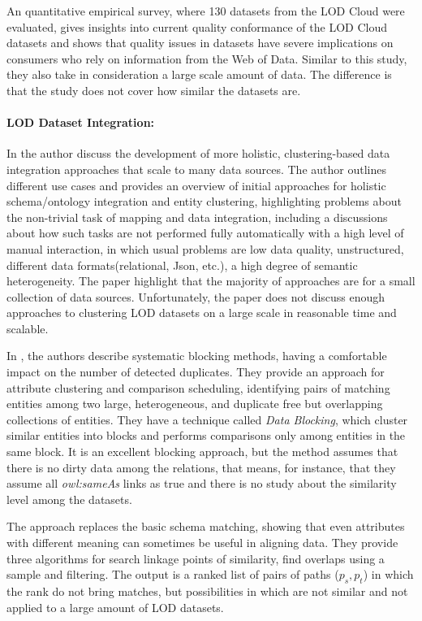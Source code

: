 \documentclass[sw]{iosart2x}
\begin{document}
An quantitative empirical survey, where 130 datasets from the LOD Cloud were evaluated, gives insights into current quality conformance of the LOD Cloud datasets\cite{debattista2018evaluating} and shows that quality issues in datasets have severe implications on consumers who rely on information from the Web
of Data.
Similar to this study, they also take in consideration a large scale amount of data.
The difference is that the study does not cover how similar the datasets are.

\paragraph*{\textbf{LOD Dataset Integration:}}
In \cite{rahm2016case} the author discuss the development of more holistic, clustering-based data integration approaches that scale to many data sources.
The author outlines different use cases and provides an overview of initial approaches for holistic schema/ontology integration and entity clustering, highlighting problems about the non-trivial task of mapping and data integration, including a discussions about how such tasks are not performed fully automatically with a high level of manual interaction, in which usual problems are low data quality, unstructured, different data formats(relational, Json, etc.), a high degree of semantic heterogeneity.
The paper highlight that the majority of approaches are for a small collection of data sources.
Unfortunately, the paper does not discuss enough approaches to clustering LOD datasets on a large scale in reasonable time and scalable.

In \cite{papadakis2012blocking}, the authors describe systematic blocking methods, having a comfortable impact on the number of detected duplicates.
They provide an approach for attribute clustering and comparison scheduling, identifying pairs of matching entities among two large, heterogeneous, and duplicate free but overlapping collections of entities.
They have a technique called \textit{Data Blocking}, which cluster similar entities into blocks and performs comparisons only among entities in the same block.
It is an excellent blocking approach, but the method assumes that there is no dirty data among the relations, that means, for instance, that they assume all \textit{owl:sameAs} links as true and there is no study about the similarity level among the datasets.
 
The approach\cite{hassanzadeh2013discovering} replaces the basic schema matching, showing that even attributes with different meaning can sometimes be useful in aligning data.
They provide three algorithms for search linkage points of similarity, find overlaps using a sample and filtering.
The output is a ranked list of pairs of paths ($p_s, p_t$) in which the rank do not bring matches, but possibilities in which are not similar and not applied to a large amount of LOD datasets.
\end{document}

